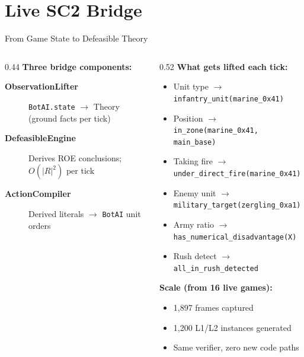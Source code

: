 \documentclass[aspectratio=169, 10pt]{beamer}
\begin{document}
\section{Live SC2 Bridge}

\begin{frame}{From Game State to Defeasible Theory}

  \begin{columns}[T]
    \begin{column}{0.44\textwidth}
      \textbf{Three bridge components:}

      \vspace{0.4em}
      \begin{description}
        \item[\textbf{ObservationLifter}] \texttt{BotAI.state} $\to$ Theory
              (ground facts per tick)
        \item[\textbf{DefeasibleEngine}] Derives ROE conclusions;
              $O(|R|^2)$ per tick
        \item[\textbf{ActionCompiler}] Derived literals $\to$
              \texttt{BotAI} unit orders
      \end{description}
    \end{column}

    \begin{column}{0.52\textwidth}
      \textbf{What gets lifted each tick:}
      \begin{itemize}[leftmargin=1.2em, itemsep=2pt]
        \item Unit type \(\to\) \texttt{infantry\_unit(marine\_0x41)}
        \item Position \(\to\) \texttt{in\_zone(marine\_0x41, main\_base)}
        \item Taking fire \(\to\) \texttt{under\_direct\_fire(marine\_0x41)}
        \item Enemy unit \(\to\) \texttt{military\_target(zergling\_0xa1)}
        \item Army ratio \(\to\) \texttt{has\_numerical\_disadvantage(X)}
        \item Rush detect \(\to\) \texttt{all\_in\_rush\_detected}
      \end{itemize}

      \vspace{0.4em}
      \textbf{Scale (from 16 live games):}
      \begin{itemize}[leftmargin=1.2em]
        \item 1,897 frames captured
        \item 1,200 L1/L2 instances generated
        \item Same verifier, zero new code paths
      \end{itemize}
    \end{column}
  \end{columns}
\end{frame}
\end{document}
